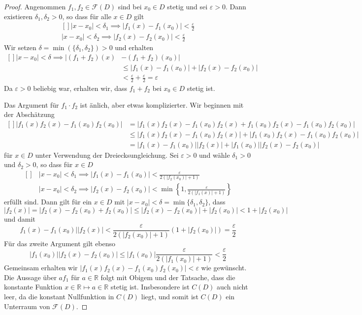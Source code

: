 \documentclass[../Analysis1_script.tex]{subfiles}
\begin{document}
\begin{proof}
	Angenommen $f_1, f_2 \in \mathcal{F}(D)$ sind bei $x_0 \in D$ stetig und sei $\varepsilon > 0$. Dann existieren $\delta_1, \delta_2 > 0$, so dass für alle $x \in D$ gilt
	\[\begin{aligned}[]
		|x - x_0| < \delta_1 \implies |f_1(x) - f_1(x_0)| < \frac{\varepsilon}{2}\\
		|x - x_0| < \delta_2 \implies |f_2(x) - f_2(x_0)| < \frac{\varepsilon}{2}
	\end{aligned}\]
	Wir setzen $\delta = \min(\{\delta_1, \delta_2\}) > 0$ und erhalten
	\[\begin{aligned}[]
		|x - x_0| < \delta \implies |(f_1 + f_2)(x) &- (f_1 + f_2)(x_0)|\\
		&\leq |f_1(x) - f_1(x_0)| + |f_2(x) - f_2(x_0)|\\
		&< \frac{\varepsilon}{2} + \frac{\varepsilon}{2} = \varepsilon
	\end{aligned}\]
	Da $\varepsilon > 0$ beliebig war, erhalten wir, dass $f_1 + f_2$ bei $x_0 \in D$ stetig ist.
	
	Das Argument für $f_1 \cdot f_2$ ist änlich, aber etwas komplizierter. Wir beginnen mit der Abschätzung
	\[\begin{aligned}[]
		|f_1(x)f_2(x) - f_1(x_0)f_2(x_0)| &= |f_1(x)f_2(x) - f_1(x_0)f_2(x) + f_1(x_0)f_2(x) - f_1(x_0)f_2(x_0)|\\ 
		&\leq |f_1(x)f_2(x) - f_1(x_0)f_2(x)| + |f_1(x_0)f_2(x) - f_1(x_0)f_2(x_0)|\\
		&= |f_1(x) - f_1(x_0)||f_2(x)| + |f_1(x_0)||f_2(x) - f_2(x_0)|
	\end{aligned}\]
	für $x \in D$ unter Verwendung der Dreiecksungleichung. Sei $\varepsilon > 0$ und wähle $\delta_1 > 0$ und $\delta_2 > 0$, so dass für $x \in D$
	\[\begin{aligned}[]
		&|x - x_0| < \delta_1 \implies |f_1(x) - f_1(x_0)| < \frac{\varepsilon}{2(|f_2(x_0)| + 1)}\\
		&|x - x_0| < \delta_2 \implies |f_2(x) - f_2(x_0)| < \min\left\{1, \frac{\varepsilon}{2(|f_1(x)| + 1)}\right\}
	\end{aligned}\]
	erfüllt sind. Dann gilt für ein $x \in D$ mit $|x - x_0| < \delta = \min\{\delta_1, \delta_2\}$, dass
	\[|f_2(x)| = |f_2(x) - f_2(x_0) + f_2(x_0)| \leq |f_2(x) - f_2(x_0)| + |f_2(x_0)| < 1 + |f_2(x_0)|\]
	und damit
	\[f_1(x) - f_1(x_0)||f_2(x)| < \frac{\varepsilon}{2(|f_2(x_0)| + 1)}(1 + |f_2(x_0)|) = \frac{\varepsilon}{2}\]
	Für das zweite Argument gilt ebenso
	\[|f_1(x_0)||f_2(x) - f_2(x_0)| \leq |f_1(x_0)|\frac{\varepsilon}{2(|f_1(x_0)| + 1)} < \frac{\varepsilon}{2}\]
	Gemeinsam erhalten wir $|f_1(x)f_2(x) - f_1(x_0)f_2(x_0)| < \varepsilon$ wie gewünscht. Die Aussage über $af_1$ für $a \in \mathbb{R}$ folgt mit Obigem und der Tatsache, dass die konstante Funktion $x \in \mathbb{R} \mapsto a \in \mathbb{R}$ stetig ist. Insbesondere ist $C(D)$ auch nicht leer, da die konstant Nullfunktion in $C(D)$ liegt, und somit ist $C(D)$ ein Unterraum von $\mathcal{F}(D)$.
\end{proof}
\end{document}
